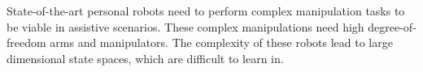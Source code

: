 \documentclass{sig-alternate}
\begin{document}





State-of-the-art personal robots need to perform complex manipulation tasks to be viable in assistive scenarios. These complex manipulations need high degree-of-freedom arms and manipulators. The complexity of these robots lead to large dimensional state spaces, which are difficult to learn in. %
\end{document}
